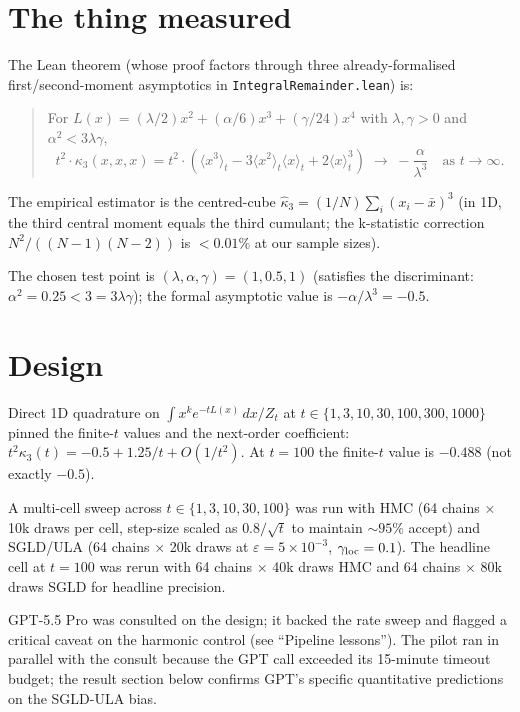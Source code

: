 \documentclass[11pt]{article}
\begin{document}
\section{The thing measured}

The Lean theorem (whose proof factors through three
already-formalised first/second-moment asymptotics in
\texttt{IntegralRemainder.lean}) is:

\begin{quote}
For $L(x) = (\lambda/2) x^2 + (\alpha/6) x^3 + (\gamma/24) x^4$ with
$\lambda, \gamma > 0$ and $\alpha^2 < 3\lambda\gamma$,
\[
  t^2 \cdot \kappa_3(x, x, x)
  = t^2 \cdot \left( \langle x^3 \rangle_t - 3 \langle x^2 \rangle_t
        \langle x \rangle_t + 2 \langle x \rangle_t^3 \right)
  \;\longrightarrow\; -\frac{\alpha}{\lambda^3}
  \quad \text{as } t \to \infty.
\]
\end{quote}

The empirical estimator is the centred-cube
$\hat\kappa_3 = (1/N) \sum_i (x_i - \bar x)^3$ (in 1D, the third
central moment equals the third cumulant; the k-statistic correction
$N^2/((N-1)(N-2))$ is $< 0.01\%$ at our sample sizes).

The chosen test point is $(\lambda, \alpha, \gamma) = (1, 0.5, 1)$
(satisfies the discriminant: $\alpha^2 = 0.25 < 3 = 3 \lambda \gamma$);
the formal asymptotic value is $-\alpha/\lambda^3 = -0.5$.

\section{Design}

Direct 1D quadrature on $\int x^k e^{-t L(x)}\,dx / Z_t$ at
$t \in \{1, 3, 10, 30, 100, 300, 1000\}$ pinned the finite-$t$
values and the next-order coefficient: $t^2 \kappa_3(t) = -0.5
+ 1.25/t + O(1/t^2)$. At $t = 100$ the finite-$t$ value is $-0.488$
(not exactly $-0.5$).

A multi-cell sweep across $t \in \{1, 3, 10, 30, 100\}$ was run
with HMC (64 chains $\times$ 10k draws per cell, step-size scaled
as $0.8/\sqrt{t}$ to maintain $\sim 95\%$ accept) and SGLD/ULA
(64 chains $\times$ 20k draws at $\varepsilon = 5{\times}10^{-3}$,
$\gamma_{\rm loc} = 0.1$). The headline cell at $t = 100$ was
rerun with 64 chains $\times$ 40k draws HMC and 64 chains $\times$
80k draws SGLD for headline precision.

GPT-5.5 Pro was consulted on the design; it backed the rate sweep
and flagged a critical caveat on the harmonic control (see
``Pipeline lessons''). The pilot ran in parallel with the consult
because the GPT call exceeded its 15-minute timeout budget; the
result section below confirms GPT's specific quantitative
predictions on the SGLD-ULA bias.
\end{document}
